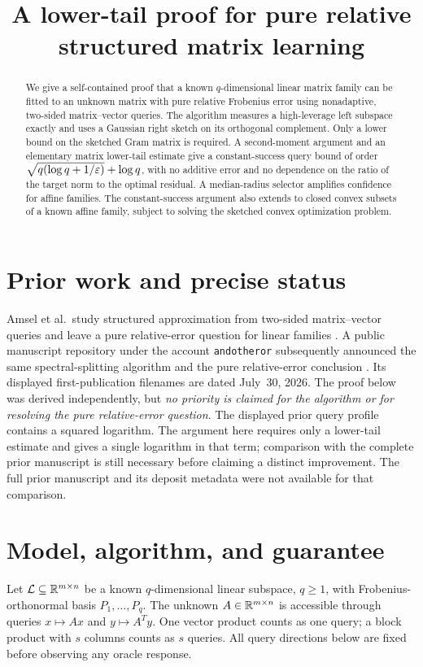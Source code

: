 \documentclass[11pt]{article}
\title{A lower-tail proof for pure relative structured matrix learning}
\author{}
\date{}
\begin{document}
\maketitle
\begin{abstract}
We give a self-contained proof that a known $q$-dimensional linear matrix family can be fitted to an unknown matrix with pure relative Frobenius error using nonadaptive, two-sided matrix--vector queries. The algorithm measures a high-leverage left subspace exactly and uses a Gaussian right sketch on its orthogonal complement. Only a lower bound on the sketched Gram matrix is required. A second-moment argument and an elementary matrix lower-tail estimate give a constant-success query bound of order $\sqrt{q(\log q+1/\varepsilon)}+\log q$, with no additive error and no dependence on the ratio of the target norm to the optimal residual. A median-radius selector amplifies confidence for affine families. The constant-success argument also extends to closed convex subsets of a known affine family, subject to solving the sketched convex optimization problem.
\end{abstract}

\section{Prior work and precise status}
Amsel et al.\ study structured approximation from two-sided matrix--vector queries and leave a pure relative-error question for linear families \cite{Amsel2026}. A public manuscript repository under the account \texttt{andotheror} subsequently announced the same spectral-splitting algorithm and the pure relative-error conclusion \cite{Prior2026}. Its displayed first-publication filenames are dated July~30, 2026. The proof below was derived independently, but \emph{no priority is claimed for the algorithm or for resolving the pure relative-error question}. The displayed prior query profile contains a squared logarithm. The argument here requires only a lower-tail estimate and gives a single logarithm in that term; comparison with the complete prior manuscript is still necessary before claiming a distinct improvement. The full prior manuscript and its deposit metadata were not available for that comparison.

\section{Model, algorithm, and guarantee}
Let $\mathcal L\subseteq\mathbb R^{m\times n}$ be a known $q$-dimensional linear subspace, $q\ge1$, with Frobenius-orthonormal basis $P_1,\ldots,P_q$. The unknown $A\in\mathbb R^{m\times n}$ is accessible through queries $x\mapsto Ax$ and $y\mapsto A^Ty$. One vector product counts as one query; a block product with $s$ columns counts as $s$ queries. All query directions below are fixed before observing any oracle response.
\end{document}
